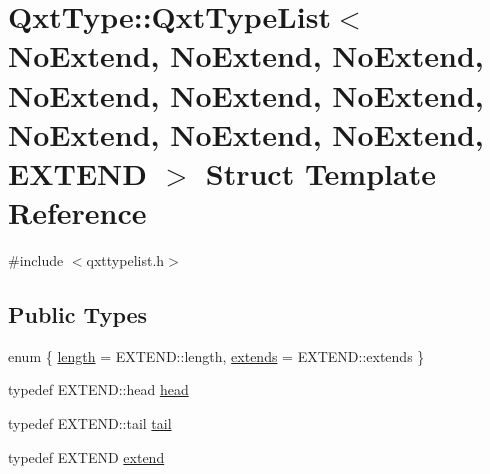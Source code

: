 \hypertarget{struct_qxt_type_1_1_qxt_type_list_3_01_no_extend_00_01_no_extend_00_01_no_extend_00_01_no_extendaa1bb8779fce2c4754d395885150af9f}{\section{Qxt\-Type\-:\-:Qxt\-Type\-List$<$ No\-Extend, No\-Extend, No\-Extend, No\-Extend, No\-Extend, No\-Extend, No\-Extend, No\-Extend, No\-Extend, E\-X\-T\-E\-N\-D $>$ Struct Template Reference}
\label{struct_qxt_type_1_1_qxt_type_list_3_01_no_extend_00_01_no_extend_00_01_no_extend_00_01_no_extendaa1bb8779fce2c4754d395885150af9f}
}


{\ttfamily \#include $<$qxttypelist.\-h$>$}

\subsection*{Public Types}
\begin{DoxyCompactItemize}
\item 
enum \{ \hyperlink{struct_qxt_type_1_1_qxt_type_list_3_01_no_extend_00_01_no_extend_00_01_no_extend_00_01_no_extendaa1bb8779fce2c4754d395885150af9f_af3b11a3d2c0a70213a5d63b4c245e283af78c470dd8bb1f2a163a7cd32d432687}{length} = E\-X\-T\-E\-N\-D\-:\-:length, 
\hyperlink{struct_qxt_type_1_1_qxt_type_list_3_01_no_extend_00_01_no_extend_00_01_no_extend_00_01_no_extendaa1bb8779fce2c4754d395885150af9f_af3b11a3d2c0a70213a5d63b4c245e283a2bca87685509f9898e7b4fc584f34f8a}{extends} = E\-X\-T\-E\-N\-D\-:\-:extends
 \}
\item 
typedef E\-X\-T\-E\-N\-D\-::head \hyperlink{struct_qxt_type_1_1_qxt_type_list_3_01_no_extend_00_01_no_extend_00_01_no_extend_00_01_no_extendaa1bb8779fce2c4754d395885150af9f_a4ec9cdafe20b8421ee90335829fcbf8b}{head}
\item 
typedef E\-X\-T\-E\-N\-D\-::tail \hyperlink{struct_qxt_type_1_1_qxt_type_list_3_01_no_extend_00_01_no_extend_00_01_no_extend_00_01_no_extendaa1bb8779fce2c4754d395885150af9f_abe1414b7d5185988443aba8bf13c65a4}{tail}
\item 
typedef E\-X\-T\-E\-N\-D \hyperlink{struct_qxt_type_1_1_qxt_type_list_3_01_no_extend_00_01_no_extend_00_01_no_extend_00_01_no_extendaa1bb8779fce2c4754d395885150af9f_a47b38788a648309f65fab6cbfa5070a2}{extend}
\end{DoxyCompactItemize}


